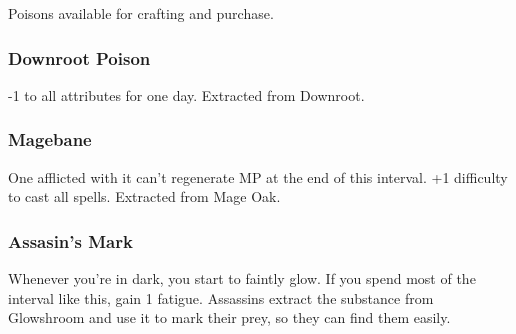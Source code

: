 \begin{multicols}{2}

Poisons available for crafting and purchase.

\subsubsection{Downroot Poison}

-1 to all attributes for one day.
Extracted from Downroot.

\subsubsection{Magebane}

One afflicted with it can't regenerate MP at the end of this \gls{interval}.
+1 difficulty to cast all spells.
Extracted from Mage Oak.

\subsubsection{Assasin's Mark}

Whenever you're in dark, you start to faintly glow.
If you spend most of the \gls{interval} like this, gain 1 \gls{fatigue}.
Assassins extract the substance from Glowshroom and use it to mark their prey, so they can find them easily.

\end{multicols}
